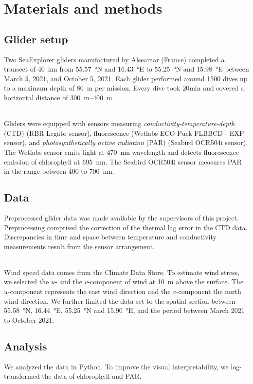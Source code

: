 \documentclass[../Main.tex]{subfiles}
\begin{document}
\section*{\crule[blue]{.3cm}{.3cm} Materials and methods}
\subsection*{\crule[blue]{.2cm}{.2cm} Glider setup}
Two SeaExplorer gliders manufactured by Alseamar (France) completed a transect of \SI{40}{km} from \SI{55.57}{\degree}N and \SI{16.43}{\degree}E to \SI{55.25}{\degree}N and \SI{15.98}{\degree}E between March 5, 2021, and October 5, 2021. 
Each glider performed around 1500 dives up to a maximum depth of \SI{80}{m} per mission. 
Every dive took 20min and covered a horizontal distance of \SIrange{300}{400}{m}. 

\\ 
Gliders were equipped with sensors measuring \emph{conductivity-temperature-depth} (CTD) (RBR Legato sensor), fluorescence (Wetlabs ECO Puck FLBBCD - EXP sensor), and \emph{photosynthetically active radiation} (PAR) (Seabird OCR504i sensor). 
The Wetlabs sensor emits light at \SI{470}{nm} wavelength and detects fluorescence emission of chlorophyll at \SI{695}{nm}. 
The Seabird OCR504i sensor measures PAR in the range between 400 to \SI{700}{nm}\supercite{ACSA2014}.

\subsection*{\crule[blue]{.2cm}{.2cm} Data}
Preprocessed glider data was made available by the supervisors of this project. Preprocessing comprised the correction of the thermal lag error in the CTD data.
Discrepancies in time and space between temperature and conductivity measurements result from the sensor arrangement\supercite{Garau2011}.

\\
Wind speed data comes from the Climate Data Store\supercite{era}. 
To estimate wind stress, we selected the $u$- and the $v$-component of wind at \SI{10}{m} above the surface. 
The $u$-component represents the east wind direction and the $v$-component the north wind direction\supercite{era2}. 
We further limited the data set to the spatial section between \SI{55.58}{\degree}N, \SI{16.44}{\degree}E, \SI{55.25}{\degree}N and \SI{15.90}{\degree}E, and the period between March 2021 to October 2021. 

\subsection*{\crule[blue]{.2cm}{.2cm} Analysis}
We analyzed the data in Python.
To improve the visual interpretability, we log-transformed the data of chlorophyll and PAR.
\end{document}
